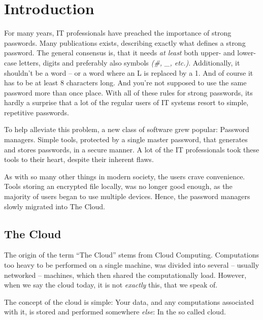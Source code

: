















\chapter{Introduction}
\label{chap:intro}
	For many years, IT professionals have preached the importance of strong passwords. Many publications exists, describing exactly what defines a strong password. The general consensus is, that it needs \emph{at least} both upper- and lower-case letters, digits and preferably also symbols \emph{(\#, \_, etc.)}. Additionally, it shouldn't be a word -- or a word where an L is replaced by a 1. And of course it has to be at least 8 characters long. And you're not supposed to use the same password more than once place. With all of these rules for strong passwords, its hardly a surprise that a lot of the regular users of IT systems resort to simple, repetitive passwords.

	To help alleviate this problem, a new class of software grew popular: Password managers. Simple tools, protected by a single master password, that generates and stores passwords, in a secure manner. A lot of the IT professionals took these tools to their heart, despite their inherent flaws. 

	As with so many other things in modern society, the users crave convenience. Tools storing an encrypted file locally, was no longer good enough, as the majority of users began to use multiple devices. Hence, the password managers slowly migrated into The Cloud.

	\section{The Cloud}
		The origin of the term ``The Cloud'' stems from Cloud Computing. Computations too heavy to be performed on a single machine, was divided into several -- usually networked -- machines, which then shared the computationally load. However, when we say the cloud today, it is not \emph{exactly} this, that we speak of.

		The concept of the cloud is simple: Your data, and any computations associated with it, is stored and performed somewhere \emph{else}: In the so called cloud.

